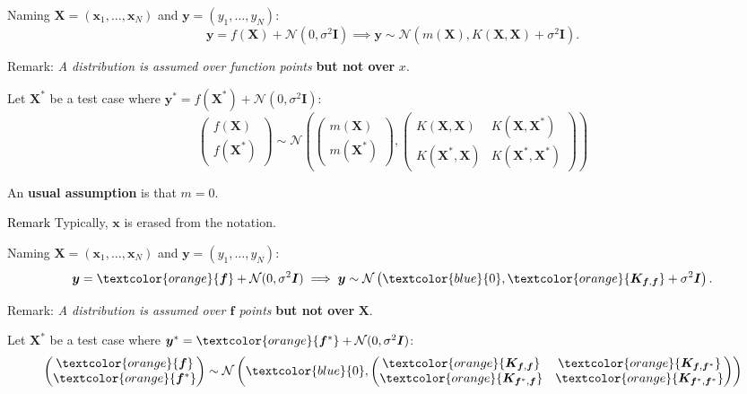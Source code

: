 \documentclass[10pt]{beamer}
\begin{document}
\begin{frame}
    Naming \( \bm{X} = (\bm{x}_1, \dots, \bm{x}_N) \) and \( \bm{y} = (y_1,\dots, y_N) \):
    \[
         \bm{y} = f(\bm{X}) + \mathcal{N}(0, \sigma^2 \bm{I}) \implies \bm{y} \sim \mathcal{N}\left( m(\bm{X}), K(\bm{X}, \bm{X}) + \sigma^2\bm{I} \right).
    \]

    Remark: \emph{A distribution is assumed over function points} \textbf{but not over} \( x \).

    Let \( \bm{X}^* \) be a test case where \( \bm{y}^* =  f(\bm{X}^*) + \mathcal{N}(0, \sigma^2 \bm{I})\):
    \[
         \begin{pmatrix} f(\bm{X}) \\ f(\bm{X}^*) \end{pmatrix} \sim \mathcal{N}\left( 
             \begin{pmatrix}
             m(\bm{X}) \\ m(\bm X^*)
         \end{pmatrix}, \begin{pmatrix}
             K ( \bm{X} , \bm X) & K(\bm X, \bm X^*) \\
             K (\bm X^*, \bm X) & K (\bm X^*, \bm X^*)
         \end{pmatrix} \right)
    \]
    
    An \textbf{usual assumption} is that \( m = 0 \). 

    \begin{alertblock}{\textcolor{black}{Remark}}
        Typically, \( \bm x \) is erased from the notation.
    \end{alertblock}
\end{frame}


\begin{frame}
    Naming \( \bm{X} = (\bm{x}_1, \dots, \bm{x}_N) \) and \( \bm{y} = (y_1,\dots, y_N) \):
    \[
         \bm{y} = \textcolor{orange}{\bm{f}} + \mathcal{N}(0, \sigma^2 \bm{I}) \implies \bm{y} \sim \mathcal{N}\left( \textcolor{blue}{0}, \textcolor{orange}{\bm K_{\bm f, \bm{f}}} + \sigma^2\bm{I} \right).
    \]

    Remark: \emph{A distribution is assumed over \( \bm f \)  points} \textbf{but not over} \( \bm X \).

    Let \( \bm{X}^* \) be a test case where \( \bm{y}^* = \textcolor{orange}{\bm{f}^*} + \mathcal{N}(0, \sigma^2 \bm{I})\):
    \[
         \begin{pmatrix} \textcolor{orange}{\bm{f}} \\ \textcolor{orange}{\bm{f}^*} \end{pmatrix} \sim \mathcal{N}\left( 
             \textcolor{blue}{0}, \begin{pmatrix}
            \textcolor{orange}{\bm K_{\bm f, \bm f}} & \textcolor{orange}{\bm K_{\bm f, \bm f^*}} \\
            \textcolor{orange}{\bm K_{\bm f^*, \bm f}} & \textcolor{orange}{\bm K_{\bm f^*, \bm f^*}}
         \end{pmatrix} \right)
    \]
\end{frame}
\end{document}
